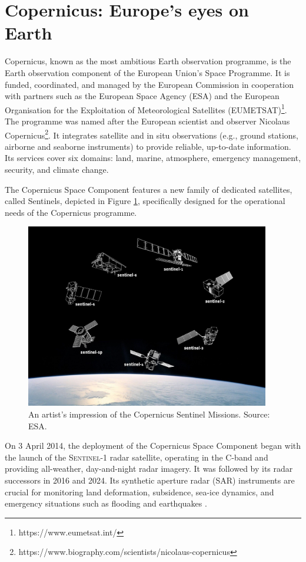 \section{Copernicus: Europe's eyes on Earth}
Copernicus, known as the most ambitious Earth observation programme, is the Earth observation component of the European Union's Space Programme.
It is funded, coordinated, and managed by the European Commission in cooperation with partners such as the European Space Agency (ESA) and the European Organisation for the Exploitation of Meteorological Satellites (EUMETSAT)\footnote{https://www.eumetsat.int/}. The programme was named after the European scientist and observer Nicolaus Copernicus\footnote{https://www.biography.com/scientists/nicolaus-copernicus}. It integrates satellite and in situ observations (e.g., ground stations, airborne and seaborne instruments) to provide reliable, up-to-date information. Its services cover six domains: land, marine, atmosphere, emergency management, security, and climate change. 

The Copernicus Space Component features a new family of dedicated satellites,
called Sentinels, depicted in Figure \ref{fig:sentinels}, specifically designed for the operational needs of the Copernicus programme. 

\begin{figure}[H]
  \centering
  \includegraphics[width=0.95\textwidth]{img/sentinels.png}
  \caption{An artist's impression of the Copernicus Sentinel Missions. Source: ESA.}
  \label{fig:sentinels}
\end{figure}

On 3 April 2014, the deployment of the Copernicus Space Component began with the
launch of the \textsc{Sentinel-1} radar satellite, operating in the C-band and providing all-weather, day-and-night radar imagery. It was followed by its radar successors in 2016 and 2024. Its synthetic aperture radar (SAR) instruments are crucial for monitoring land deformation, subsidence, sea-ice dynamics, and emergency situations such as flooding and earthquakes \cite{ESA_Copernicus,ESA_SentinelMissions}.

